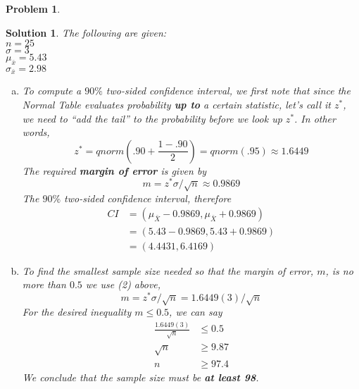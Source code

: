 \documentclass{article}
\newtheorem{problem}{Problem}
\newtheorem*{solution*}{Solution}
\begin{document}
\begin{problem}
\end{problem}
\begin{solution*}The following are given:\\
  $n=25$\\
  $\sigma=3$\\
  $\mu_{\bar{x}}=5.43$\\
  $\sigma_{\bar{x}}=2.98$
  \begin{enumerate}[(a)]
  \item To compute a $90\%$ two-sided confidence interval,
    we first note that since the Normal Table evaluates probability
    \textbf{up to} a certain statistic, let's call it $z^*$,
    we need to ``add the tail'' to the probability before 
    we look up $z^*$. In other words,
    \begin{equation}
      z^*=qnorm(.90+\frac{1-.90}{2})=qnorm(.95)\approx{1.6449}
    \end{equation}
    The required \textbf{margin of error} is given by
    \begin{equation}
      m=z^*\sigma/\sqrt{n}\approx 0.9869
    \end{equation}
    The $90\%$ two-sided confidence interval, therefore
    \begin{align*}
      CI
      &=(\mu_{\bar{X}}-0.9869, \mu_{\bar{X}}+0.9869)\\
      &=(5.43-0.9869, 5.43+0.9869)\\
      &=\boxed{(4.4431, 6.4169)}
    \end{align*}
    
    \item To find the smallest sample size needed so that the margin of
    error, $m$, is no more than $0.5$ we use (2) above,
    $$m = z^*\sigma/\sqrt{n} = 1.6449(3)/\sqrt{n}$$
    For the desired inequality $m\le{0.5}$, we can say
    \begin{align*}
      \frac{1.6449(3)}{\sqrt{n}} &\le 0.5\\
      \sqrt{n} &\ge 9.87\\
      n &\ge 97.4
    \end{align*}
    We conclude that the sample size must be \textbf{at least 98}.
\end{enumerate}

\end{solution*}
\end{document}
